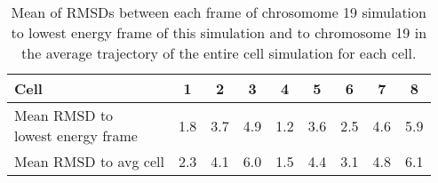 \begin{table}[ht]
\centering
  \caption{Mean of RMSDs between each frame of chrosomome 19 simulation to lowest energy frame of this simulation and to chromosome 19 in the average trajectory of the entire cell simulation for each cell.}
  \label{tab:chrom19_mean_rmsds}
  \begin{tabular}{l @{\phantom{abc}} S S S S S S S S}
  \toprule
    Cell & 1 & 2 & 3 & 4 & 5 & 6 & 7 & 8 \\
  \midrule
    \parbox{4cm}{Mean RMSD to \\ lowest energy frame} & 1.8 & 3.7 & 4.9 & 1.2 & 3.6 & 2.5 & 4.6 & 5.9 \\
    Mean RMSD to avg cell & 2.3 & 4.1 & 6.0 & 1.5 & 4.4 & 3.1 & 4.8 & 6.1 \\
  \bottomrule
  \end{tabular}
\end{table}



